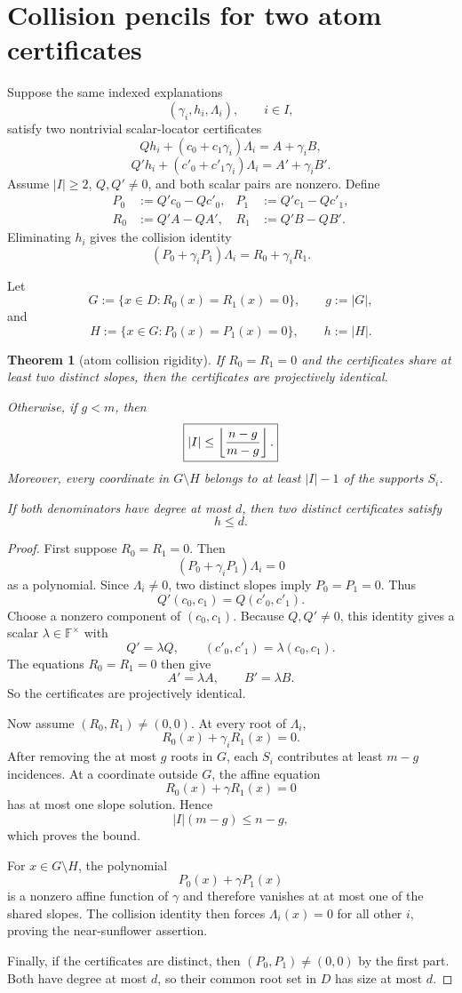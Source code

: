 \documentclass[11pt,a4paper]{amsart}
\numberwithin{equation}{section}
\newtheorem{theorem}{Theorem}[section]
\theoremstyle{remark}
\newcommand{\F}{\mathbb F}\newcommand{\B}{\mathbb B}\newcommand{\K}{\mathbb K}\newcommand{\Z}{\mathbb Z}
\begin{document}
\section{Collision pencils for two atom certificates}

Suppose the same indexed explanations
\[
 (\gamma_i,h_i,\Lambda_i),
 \qquad i\in I,
\]
satisfy two nontrivial scalar-locator certificates
\[
 Qh_i+(c_0+c_1\gamma_i)\Lambda_i=A+\gamma_iB,
\]
\[
 Q'h_i+(c'_0+c'_1\gamma_i)\Lambda_i=A'+\gamma_iB'.
\]
Assume $|I|\ge2$, $Q,Q'\ne0$, and both scalar pairs are nonzero.  Define
\[
\begin{aligned}
 P_0&:=Q'c_0-Qc'_0,
 &P_1&:=Q'c_1-Qc'_1,\\
 R_0&:=Q'A-QA',
 &R_1&:=Q'B-QB'.
\end{aligned}
\]
Eliminating $h_i$ gives the collision identity
\[
 \boxed{
 (P_0+\gamma_iP_1)\Lambda_i
 =R_0+\gamma_iR_1.
 }
\]

Let
\[
 G:=\{x\in D:R_0(x)=R_1(x)=0\},
 \qquad g:=|G|,
\]
and
\[
 H:=\{x\in G:P_0(x)=P_1(x)=0\},
 \qquad h:=|H|.
\]

\begin{theorem}[atom collision rigidity]\label{thm:collision-rigidity}
If $R_0=R_1=0$ and the certificates share at least two distinct slopes, then the certificates are projectively identical.

Otherwise, if $g<m$, then
\[
 \boxed{
 |I|\le\left\lfloor \frac{n-g}{m-g}\right\rfloor.
 }
\]
Moreover, every coordinate in $G\setminus H$ belongs to at least $|I|-1$ of the supports $S_i$.

If both denominators have degree at most $d$, then two distinct certificates satisfy
\[
 h\le d.
\]
\end{theorem}

\begin{proof}
First suppose $R_0=R_1=0$.  Then
\[
 (P_0+\gamma_iP_1)\Lambda_i=0
\]
as a polynomial.  Since $\Lambda_i\ne0$, two distinct slopes imply $P_0=P_1=0$.  Thus
\[
 Q'(c_0,c_1)=Q(c'_0,c'_1).
\]
Choose a nonzero component of $(c_0,c_1)$.  Because $Q,Q'\ne0$, this identity gives a scalar $\lambda\in\F^\times$ with
\[
 Q'=\lambda Q,
 \qquad
 (c'_0,c'_1)=\lambda(c_0,c_1).
\]
The equations $R_0=R_1=0$ then give
\[
 A'=\lambda A,
 \qquad B'=\lambda B.
\]
So the certificates are projectively identical.

Now assume $(R_0,R_1)\ne(0,0)$.  At every root of $\Lambda_i$,
\[
 R_0(x)+\gamma_iR_1(x)=0.
\]
After removing the at most $g$ roots in $G$, each $S_i$ contributes at least $m-g$ incidences.  At a coordinate outside $G$, the affine equation
\[
 R_0(x)+\gamma R_1(x)=0
\]
has at most one slope solution.  Hence
\[
 |I|(m-g)\le n-g,
\]
which proves the bound.

For $x\in G\setminus H$, the polynomial
\[
 P_0(x)+\gamma P_1(x)
\]
is a nonzero affine function of $\gamma$ and therefore vanishes at at most one of the shared slopes.  The collision identity then forces $\Lambda_i(x)=0$ for all other $i$, proving the near-sunflower assertion.

Finally, if the certificates are distinct, then $(P_0,P_1)\ne(0,0)$ by the first part.  Both have degree at most $d$, so their common root set in $D$ has size at most $d$.
\end{proof}
\end{document}
